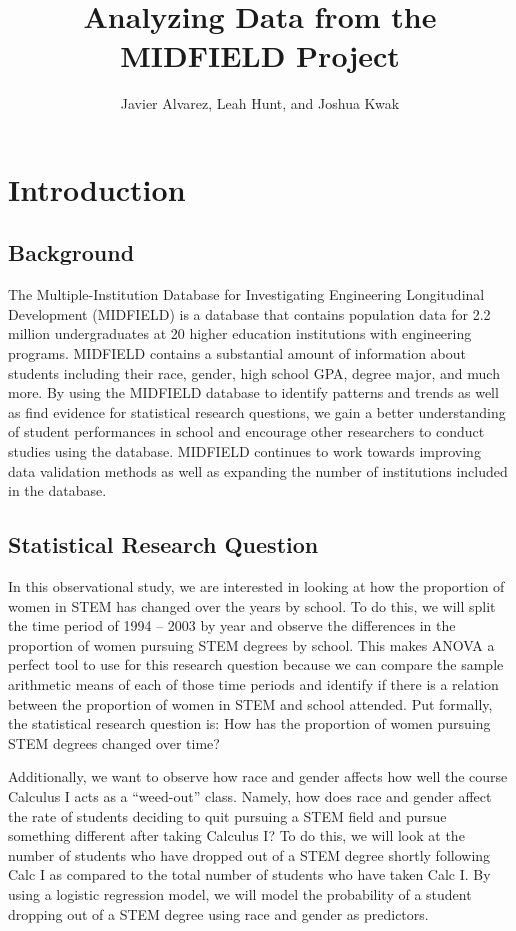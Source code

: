 \documentclass[]{article}
\title{Analyzing Data from the MIDFIELD Project}
\author{Javier Alvarez, Leah Hunt, and Joshua Kwak}
\date{}
\begin{document}
\maketitle

\section{Introduction}\label{introduction}

\subsection{Background}\label{background}

The Multiple-Institution Database for Investigating Engineering
Longitudinal Development (MIDFIELD) is a database that contains
population data for 2.2 million undergraduates at 20 higher education
institutions with engineering programs. MIDFIELD contains a substantial
amount of information about students including their race, gender, high
school GPA, degree major, and much more. By using the MIDFIELD database
to identify patterns and trends as well as find evidence for statistical
research questions, we gain a better understanding of student
performances in school and encourage other researchers to conduct
studies using the database. MIDFIELD continues to work towards improving
data validation methods as well as expanding the number of institutions
included in the database. \cite{intro}

\subsection{Statistical Research
Question}\label{statistical-research-question}

In this observational study, we are interested in looking at how the
proportion of women in STEM has changed over the years by school. To do
this, we will split the time period of 1994 -- 2003 by year and observe
the differences in the proportion of women pursuing STEM degrees by
school. This makes ANOVA a perfect tool to use for this research
question because we can compare the sample arithmetic means of each of
those time periods and identify if there is a relation between the
proportion of women in STEM and school attended. Put formally, the
statistical research question is: How has the proportion of women
pursuing STEM degrees changed over time?

Additionally, we want to observe how race and gender affects how well
the course Calculus I acts as a ``weed-out'' class. Namely, how does
race and gender affect the rate of students deciding to quit pursuing a
STEM field and pursue something different after taking Calculus I? To do
this, we will look at the number of students who have dropped out of a
STEM degree shortly following Calc I as compared to the total number of
students who have taken Calc I. By using a logistic regression model, we
will model the probability of a student dropping out of a STEM degree
using race and gender as predictors.
\end{document}
